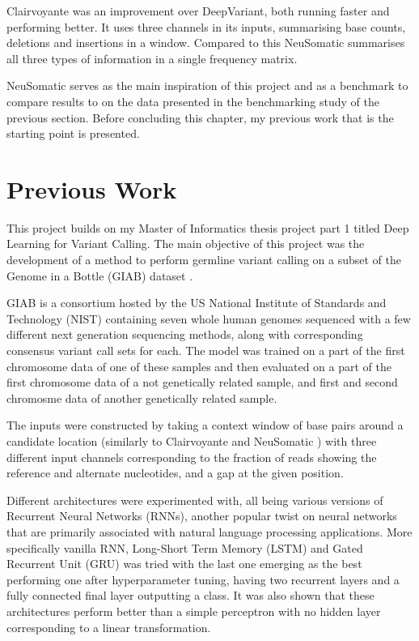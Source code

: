 \documentclass[bsc,frontabs,singlespacing,parskip,deptreport]{infthesis}
\begin{document}
Clairvoyante was an improvement over DeepVariant, both running faster and performing better. It uses three channels in its inputs, summarising base counts, deletions and insertions in a window. Compared to this NeuSomatic summarises all three types of information in a single frequency matrix.

NeuSomatic serves as the main inspiration of this project and as a benchmark to compare results to on the data presented in the benchmarking study of the previous section. Before concluding this chapter, my previous work that is the starting point is presented.

\section{Previous Work}

This project builds on my Master of Informatics thesis project part 1 titled Deep Learning for Variant Calling. The main objective of this project was the development of a method to perform germline variant calling on a subset of the Genome in a Bottle (GIAB) dataset \cite{giab1} \cite{giab2}. 

GIAB is a consortium hosted by the US National Institute of Standards and Technology (NIST) containing seven whole human genomes sequenced with a few different next generation sequencing methods, along with corresponding consensus variant call sets for each. The model was trained on a part of the first chromosome data of one of these samples and then evaluated on a part of the first chromosome data of a not genetically related sample, and first and second chromosme data of another genetically related sample.

The inputs were constructed by taking a context window of base pairs around a candidate location (similarly to Clairvoyante and NeuSomatic \cite{clairvoyante} \cite{neusomatic}) with three different input channels corresponding to the fraction of reads showing the reference and alternate nucleotides, and a gap at the given position. 

Different architectures were experimented with, all being various versions of Recurrent Neural Networks (RNNs), another popular twist on neural networks that are primarily associated with natural language processing applications. More specifically vanilla RNN, Long-Short Term Memory (LSTM) \cite{lstm} and Gated Recurrent Unit (GRU) \cite{gru} was tried with the last one emerging as the best performing one after hyperparameter tuning, having two recurrent layers and a fully connected final layer outputting a class. It was also shown that these architectures perform better than a simple perceptron with no hidden layer corresponding to a linear transformation.
\end{document}

